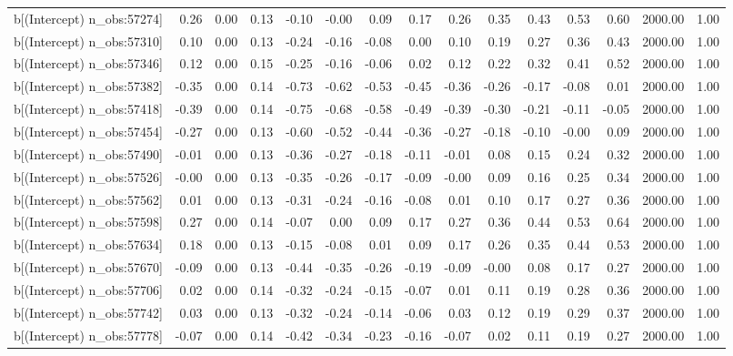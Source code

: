 \begin{table}[ht]
\begin{tabular}{rrrrrrrrrrrrrrr}
  b[(Intercept) n\_obs:57274] & 0.26 & 0.00 & 0.13 & -0.10 & -0.00 & 0.09 & 0.17 & 0.26 & 0.35 & 0.43 & 0.53 & 0.60 & 2000.00 & 1.00 \\ 
  b[(Intercept) n\_obs:57310] & 0.10 & 0.00 & 0.13 & -0.24 & -0.16 & -0.08 & 0.00 & 0.10 & 0.19 & 0.27 & 0.36 & 0.43 & 2000.00 & 1.00 \\ 
  b[(Intercept) n\_obs:57346] & 0.12 & 0.00 & 0.15 & -0.25 & -0.16 & -0.06 & 0.02 & 0.12 & 0.22 & 0.32 & 0.41 & 0.52 & 2000.00 & 1.00 \\ 
  b[(Intercept) n\_obs:57382] & -0.35 & 0.00 & 0.14 & -0.73 & -0.62 & -0.53 & -0.45 & -0.36 & -0.26 & -0.17 & -0.08 & 0.01 & 2000.00 & 1.00 \\ 
  b[(Intercept) n\_obs:57418] & -0.39 & 0.00 & 0.14 & -0.75 & -0.68 & -0.58 & -0.49 & -0.39 & -0.30 & -0.21 & -0.11 & -0.05 & 2000.00 & 1.00 \\ 
  b[(Intercept) n\_obs:57454] & -0.27 & 0.00 & 0.13 & -0.60 & -0.52 & -0.44 & -0.36 & -0.27 & -0.18 & -0.10 & -0.00 & 0.09 & 2000.00 & 1.00 \\ 
  b[(Intercept) n\_obs:57490] & -0.01 & 0.00 & 0.13 & -0.36 & -0.27 & -0.18 & -0.11 & -0.01 & 0.08 & 0.15 & 0.24 & 0.32 & 2000.00 & 1.00 \\ 
  b[(Intercept) n\_obs:57526] & -0.00 & 0.00 & 0.13 & -0.35 & -0.26 & -0.17 & -0.09 & -0.00 & 0.09 & 0.16 & 0.25 & 0.34 & 2000.00 & 1.00 \\ 
  b[(Intercept) n\_obs:57562] & 0.01 & 0.00 & 0.13 & -0.31 & -0.24 & -0.16 & -0.08 & 0.01 & 0.10 & 0.17 & 0.27 & 0.36 & 2000.00 & 1.00 \\ 
  b[(Intercept) n\_obs:57598] & 0.27 & 0.00 & 0.14 & -0.07 & 0.00 & 0.09 & 0.17 & 0.27 & 0.36 & 0.44 & 0.53 & 0.64 & 2000.00 & 1.00 \\ 
  b[(Intercept) n\_obs:57634] & 0.18 & 0.00 & 0.13 & -0.15 & -0.08 & 0.01 & 0.09 & 0.17 & 0.26 & 0.35 & 0.44 & 0.53 & 2000.00 & 1.00 \\ 
  b[(Intercept) n\_obs:57670] & -0.09 & 0.00 & 0.13 & -0.44 & -0.35 & -0.26 & -0.19 & -0.09 & -0.00 & 0.08 & 0.17 & 0.27 & 2000.00 & 1.00 \\ 
  b[(Intercept) n\_obs:57706] & 0.02 & 0.00 & 0.14 & -0.32 & -0.24 & -0.15 & -0.07 & 0.01 & 0.11 & 0.19 & 0.28 & 0.36 & 2000.00 & 1.00 \\ 
  b[(Intercept) n\_obs:57742] & 0.03 & 0.00 & 0.13 & -0.32 & -0.24 & -0.14 & -0.06 & 0.03 & 0.12 & 0.19 & 0.29 & 0.37 & 2000.00 & 1.00 \\ 
  b[(Intercept) n\_obs:57778] & -0.07 & 0.00 & 0.14 & -0.42 & -0.34 & -0.23 & -0.16 & -0.07 & 0.02 & 0.11 & 0.19 & 0.27 & 2000.00 & 1.00 \\ 

\end{tabular}
\end{table}
